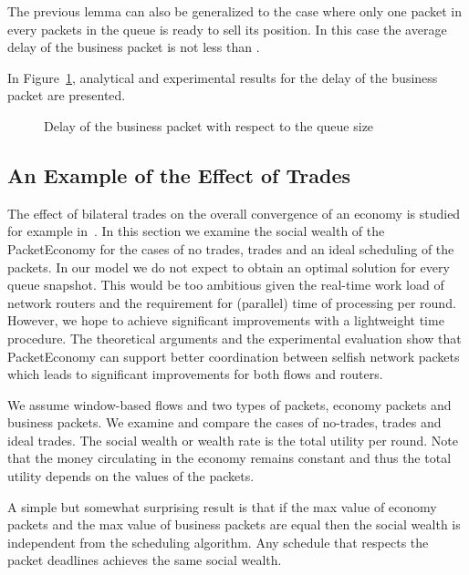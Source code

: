 \documentclass[letterpaper,10pt]{llncs}
\begin{document}
The previous lemma can also be generalized to the case where only one packet in every  packets in the queue is ready to sell its position. In this case the average delay of the business packet is not less than .

In Figure~\ref{fig:Delays}, analytical and experimental results for the delay of the business packet are presented.

\begin{figure}[!h]
\hspace{0.1\textwidth}
\caption{Delay of the business packet with respect to the queue size} \label{fig:Delays}
\end{figure}

\subsection{An Example of the Effect of Trades}
\label{sec:anarchy}

The effect of bilateral trades on the overall convergence of an economy is studied for 
example in~\cite{Feldman:1973:Bilateral}. In this section we examine the social wealth 
of the PacketEconomy for the cases of no trades, trades and an ideal scheduling of the packets.  
In our model we do not expect to obtain an optimal solution for every queue snapshot. 
This would be too ambitious
given the real-time work load of network routers and the requirement 
for  (parallel) time of processing per round. 
However, we hope to achieve significant improvements with a lightweight 
 time procedure. The theoretical arguments and the experimental
evaluation show that PacketEconomy can support better coordination between selfish network packets 
which leads to significant improvements for both flows and routers.

We assume window-based flows and two types of packets, economy packets and business packets.
We examine and compare the cases of no-trades, trades and ideal trades.
The social wealth or wealth rate is the total utility per round. Note that the money 
circulating in the economy remains constant and thus the total utility depends on the 
values of the packets.

A simple but somewhat surprising result is that if the max value
of economy packets  and the max value of business packets  are
equal then the social wealth is independent from the scheduling algorithm.
Any schedule that respects the packet deadlines achieves the same
social wealth.
\end{document}
